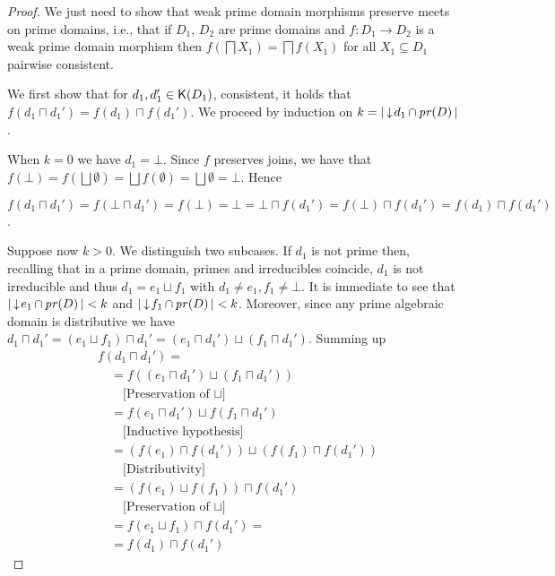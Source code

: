 \begin{proof}
  We just need to show that weak prime domain morphisms preserve meets
  on prime domains, i.e., that if $D_1$, $D_2$ are prime domains and
  $f : D_1 \to D_2$ is a weak prime domain morphism then
  $f(\bigsqcap X_1) = \bigsqcap f(X_1)$ for all $X_1 \subseteq D_1$
  pairwise consistent.
  
  We first show that for $d_1, d_1' \in \mathop{\mathsf{K}({D_1})}$, consistent, it
  holds that $f(d_1 \sqcap d_1') = f(d_1) \sqcap f(d_1')$. We proceed
  by induction on $k = |\mathop{\downarrow\!{d_1}} \cap \mathop{\mathit{pr}({D})}|$.

  When $k=0$ we have $d_1 = \bot$. Since $f$ preserves joins, we have
  that
  $f(\bot) = f(\bigsqcup \emptyset) = \bigsqcup f(\emptyset) =
  \bigsqcup \emptyset = \bot$.  Hence
  \begin{center}
    $f(d_1 \sqcap d_1') = f(\bot \sqcap d_1') = f(\bot)= \bot = \bot \sqcap
    f(d_1') = f(\bot) \sqcap f(d_1') = f(d_1) \sqcap f(d_1')$.
  \end{center}
  
  Suppose now $k > 0$. We distinguish two subcases. If $d_1$ is not
  prime then, recalling that in a prime domain, primes and
  irreducibles coincide, $d_1$ is not irreducible and thus
  $d_1 = e_1 \sqcup f_1$ with $d_1 \neq e_1, f_1 \neq \bot$. It is
  immediate to see that $|\mathop{\downarrow\!{e_1}} \cap \mathop{\mathit{pr}({D})}| < k$ and
  $|\mathop{\downarrow\!{f_1}} \cap \mathop{\mathit{pr}({D})}| < k$. Moreover, since any prime
  algebraic domain is distributive we have
  $d_1 \sqcap d_1' = (e_1 \sqcup f_1) \sqcap d_1' = (e_1 \sqcap d_1')
  \sqcup (f_1 \sqcap d_1')$. Summing up
  \begin{align*}
    & f(d_1 \sqcap d_1') = \\[1mm]
    & \quad =f((e_1 \sqcap d_1') \sqcup (f_1 \sqcap d_1'))\\
    & \qquad \mbox{[Preservation of $\sqcup$]}\\[1mm]
    & \quad =f(e_1 \sqcap d_1') \sqcup f(f_1 \sqcap d_1')\\
    & \qquad \mbox{[Inductive hypothesis]}\\[1mm]
    & \quad =(f(e_1) \sqcap f(d_1')) \sqcup (f(f_1) \sqcap f(d_1'))\\
    & \qquad \mbox{[Distributivity]}\\[1mm]
    & \quad =(f(e_1) \sqcup f(f_1)) \sqcap f(d_1')\\
    & \qquad \mbox{[Preservation of $\sqcup$]}\\[1mm]
    & \quad =f(e_1 \sqcup f_1) \sqcap f(d_1') =\\[1mm]
    & \quad =f(d_1) \sqcap f(d_1')
  \end{align*}


\end{proof}
